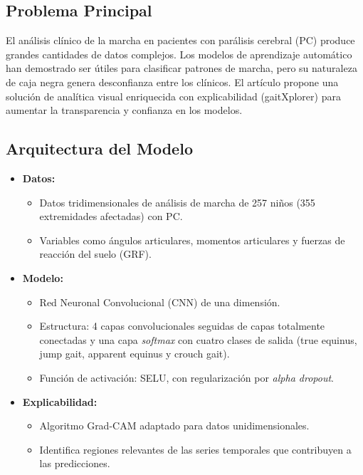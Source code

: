\documentclass{report}
\begin{document}
\subsection{Problema Principal}
El análisis clínico de la marcha en pacientes con parálisis cerebral (PC) produce grandes cantidades de datos complejos. Los modelos de aprendizaje automático han demostrado ser útiles para clasificar patrones de marcha, pero su naturaleza de caja negra genera desconfianza entre los clínicos. El artículo propone una solución de analítica visual enriquecida con explicabilidad (gaitXplorer) para aumentar la transparencia y confianza en los modelos.

\subsection{Arquitectura del Modelo}
\begin{itemize}
    \item \textbf{Datos:} 
    \begin{itemize}
        \item Datos tridimensionales de análisis de marcha de 257 niños (355 extremidades afectadas) con PC.
        \item Variables como ángulos articulares, momentos articulares y fuerzas de reacción del suelo (GRF).
    \end{itemize}
    \item \textbf{Modelo:} 
    \begin{itemize}
        \item Red Neuronal Convolucional (CNN) de una dimensión.
        \item Estructura: 4 capas convolucionales seguidas de capas totalmente conectadas y una capa \textit{softmax} con cuatro clases de salida (true equinus, jump gait, apparent equinus y crouch gait).
        \item Función de activación: SELU, con regularización por \textit{alpha dropout}.
    \end{itemize}
    \item \textbf{Explicabilidad:} 
    \begin{itemize}
        \item Algoritmo Grad-CAM adaptado para datos unidimensionales.
        \item Identifica regiones relevantes de las series temporales que contribuyen a las predicciones.
    \end{itemize}
\end{itemize}
\end{document}
